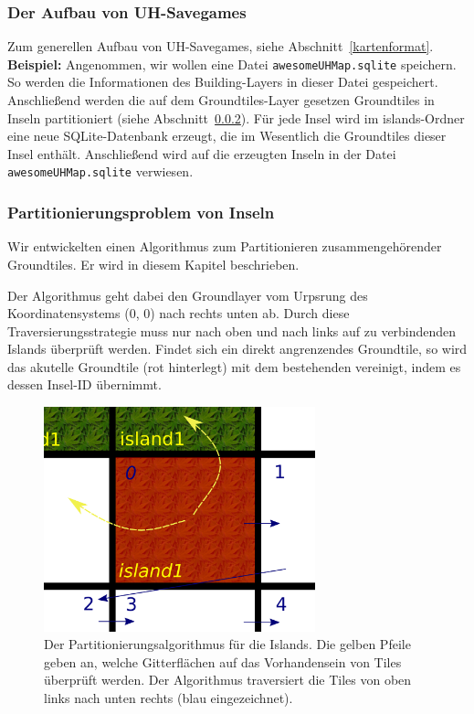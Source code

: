 \subsubsection{Der Aufbau von UH-Savegames}
Zum generellen Aufbau von UH-Savegames, siehe Abschnitt~\ref{kartenformat}.
{\bf Beispiel:} Angenommen, wir wollen eine Datei {\tt awesomeUHMap.sqlite}
speichern. So werden die Informationen des Building-Layers in dieser Datei
gespeichert. Anschließend werden die auf dem Groundtiles-Layer gesetzen
Groundtiles in Inseln partitioniert (siehe Abschnitt~\ref{sec:partionierung}).
Für jede Insel wird im islands-Ordner eine neue SQLite-Datenbank erzeugt, die im
Wesentlich die Groundtiles dieser Insel enthält. Anschließend wird auf die
erzeugten Inseln in der Datei {\tt awesomeUHMap.sqlite} verwiesen.

\subsubsection{Partitionierungsproblem von Inseln}
\label{sec:partionierung}
Wir entwickelten einen Algorithmus zum Partitionieren zusammengehörender
Groundtiles. Er wird in diesem Kapitel beschrieben.

Der Algorithmus geht dabei den Groundlayer vom Urpsrung des Koordinatensystems
(0, 0) nach rechts unten ab. Durch diese Traversierungsstrategie muss nur nach
oben und nach links auf zu verbindenden Islands überprüft werden. Findet sich
ein direkt angrenzendes Groundtile, so wird das akutelle Groundtile (rot
hinterlegt) mit dem bestehenden vereinigt, indem es dessen Insel-ID übernimmt.

%
%
\begin{figure}[htbp]
  \centering

    \includegraphics[width=0.7\textwidth]{gfx/merge_algorithm.png}

  \caption{Der Partitionierungsalgorithmus für die Islands. Die gelben Pfeile
  geben an, welche Gitterflächen auf das Vorhandensein von Tiles überprüft
  werden. Der Algorithmus traversiert die Tiles von oben links nach unten
  rechts (blau eingezeichnet).}
  \label{figure:automaton-intersection}
\end{figure}

